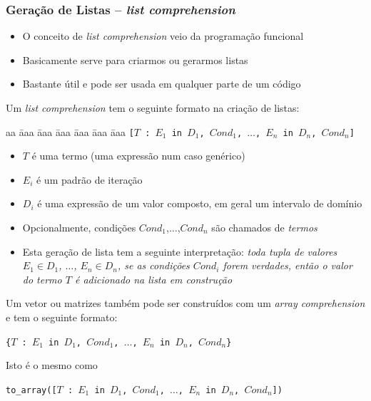 \begin{frame}[fragile, allowframebreaks=0.9]

\frametitle{Geração de  Listas -- \textit{list comprehension}}

\begin{block}{}
\begin{itemize}
  \item O conceito de \textit{list comprehension} veio da programação funcional
  \item Basicamente serve para criarmos ou gerarmos listas
  \item Bastante útil e pode ser usada em qualquer parte de um código
  
\end{itemize}
\end{block}

\framebreak

Um \textit{list comprehension} tem o seguinte formato
na criação de listas:
\begin{tabbing}
aa \= aaa \= aaa \= aaa \= aaa \= aaa \= aaa \kill
\> \> \texttt{[$T$ : $E_1$ \texttt{in} $D_1$, $Cond_1$, $\ldots$, $E_n$ in $D_n$, $Cond_n$]} 
\end{tabbing}
\begin{itemize}
  \item $T$ é uma termo (uma expressão num caso genérico)
  \item $E_i$ é um padrão de iteração 
  \item $D_i$ é uma expressão de um valor composto, em geral um intervalo de domínio
  \item Opcionalmente,  condições $Cond_1$,$\ldots$,$Cond_n$  são chamados de \textit{termos}
  \item Esta geração de lista tem a seguinte interpretação: \textit{toda tupla de valores $E_1 \in D_1$, $\ldots$, $E_n \in D_n$, 
  se as condições $Cond_i$ forem verdades, então o valor do termo $T$ é adicionado na lista em construção}
\end{itemize}


\framebreak
Um vetor ou matrizes também pode 
ser construídos com um  \textit{array comprehension} e tem
o seguinte formato:
\begin{center}
\texttt{\{$T$ : $E_1$ \texttt{in} $D_1$, $Cond_1$, $\ldots$, $E_n$ in $D_n$, $Cond_n$\}} 
\end{center}

Isto é o mesmo como
\begin{center}
\texttt{to\_array([$T$ : $E_1$ \texttt{in} $D_1$, $Cond_1$, $\ldots$, $E_n$ in $D_n$, $Cond_n$])} 

\end{center}
\end{frame}

